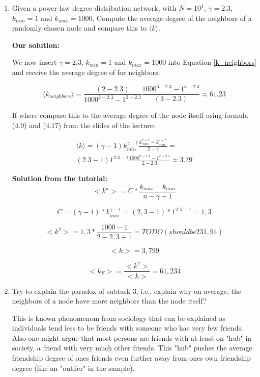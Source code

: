 \begin{enumerate}
	\item Given a power-law degree distribution network, with $N = 10^4$, $\gamma = 2.3$, $k_{min} = 1$ and $k_{max} = 1000$. Compute the average degree of the neighbors of a randomly chosen node and compare this to $\langle k \rangle$.
	
	\textbf{Our solution:}
	
	We now insert $\gamma = 2.3$, $k_{min} = 1$ and $k_{max} = 1000$ into Equation \ref{k_neighbors} and receive the average degree of for neighbors:
	
	\begin{equation}
		\langle k_{neighbors} \rangle = \frac{(2-2.3)}{1000^{2-2.3} - 1^{2-2.3}} \frac{1000^{3-2.3} - 1^{3-2.3}}{(3-2.3)} \approx 61.23
	\end{equation}

	If where compare this to the average degree of the node itself using formula (4.9) and (4.17) from the slides of the lecture:
	
	\begin{equation} \label{k_neighbors}
		\begin{split}
			\langle k \rangle = (\gamma-1) k_{min}^{\gamma-1} \frac{k_{max}^{2-\gamma} - k_{min}^{2-\gamma}}{2-\gamma} = \\
			(2.3-1) 1^{2.3-1} \frac{1000^{2-2.3} - 1^{2-2.3}}{2-2.3} \approx 3.79
		\end{split}
	\end{equation}
	
	\textbf{Solution from the tutorial:}
	\begin{equation}
		<k^n> = C * \frac{k_{max} - k_{min}}{n - \gamma + 1}
	\end{equation}

	\begin{equation}
		C = (\gamma - 1) * k_{min}^{\gamma - 1} = (2,3 - 1) * 1^{2,3 - 1} = 1,3
	\end{equation}
	
	\begin{equation}
		<k^2> = 1,3 * \frac{1000 - 1}{2 - 2,3 + 1} = TODO (should be 231,94)
	\end{equation}
	
	\begin{equation}
		<k> = 3,799
	\end{equation}
	
	\begin{equation}
		<k_F> = \frac{<k^2>}{<k>} = 61,234
	\end{equation}
	
	\item Try to explain the paradox of subtask 3, i.e., explain why on average, the neighbors of a node have more neighbors than the node itself?
	
	This is known phenomenom from sociology that can be explained as individuals tend less to be friends with someone who has very few friends. Also one might argue that most persons are friends with at least on "hub" in society, a friend with very much other friends. This "hub" pushes the average friendship degree of ones friends even further away from ones own friendship degree (like an "outlier" in the sample). 
		
\end{enumerate}